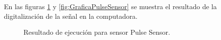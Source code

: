 %
%
%	
%
%	
%	
%	

En las figuras  \ref{fig:TerminalPulseSensor} y \ref{fig:GraficaPulseSensor} se muestra el resultado de la digitalización de la señal en la computadora.
	
	\begin{figure}[htbp!]
		\centering
		\caption{Resultado de ejecución para sensor Pulse Sensor.}
		\label{fig:TerminalPulseSensor}
	\end{figure}
	
